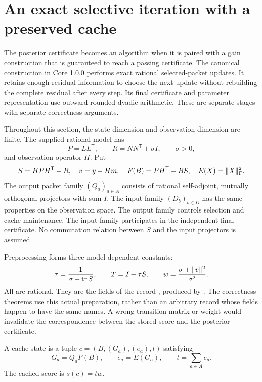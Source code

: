 \section{An exact selective iteration with a preserved cache}
\label{sec:solver-cache}

The posterior certificate becomes an algorithm when it is paired with a gain
construction that is guaranteed to reach a passing certificate. The canonical
construction in Core 1.0.0 performs exact rational selected-packet updates. It
retains enough residual information to choose the next update without rebuilding
the complete residual after every step. Its final certificate and parameter
representation use outward-rounded dyadic arithmetic. These are separate stages
with separate correctness arguments.

Throughout this section, the state dimension and observation dimension are finite.
The supplied rational model has
\[
 P=LL^{\mathsf T},\qquad R=NN^{\mathsf T}+\sigma I,
 \qquad \sigma>0,
\]
and observation operator $H$. Put
\[
 S=HPH^{\mathsf T}+R,\quad v=y-Hm,\quad
 F(B)=PH^{\mathsf T}-BS,\quad E(X)=\lVert X\rVert_{\mathrm F}^{2}.
\]
The output packet family $(Q_a)_{a\in A}$ consists of rational self-adjoint,
mutually orthogonal projectors with sum $I$. The input family $(D_b)_{b\in D}$
has the same properties on the observation space. The output family controls
selection and cache maintenance. The input family participates in the independent
final certificate. No commutation relation between $S$ and the input projectors
is assumed.

Preprocessing forms three model-dependent constants:
\begin{equation}
 \tau=\frac{1}{\sigma+\operatorname{tr} S},\qquad T=I-\tau S,
 \qquad w=\frac{\sigma+\lVert v\rVert^{2}}{\sigma^{2}}.
 \label{eq:solver-kernel}
\end{equation}
All are rational. They are the fields of the record
, produced by
. The correctness theorems use this actual
preparation, rather than an arbitrary record whose fields happen to have the same
names. A wrong transition matrix or weight would invalidate the correspondence
between the stored score and the posterior certificate.

\begin{definition}
A cache state is a tuple $c=(B,(G_a),(e_a),t)$ satisfying
\begin{equation}
 G_a=Q_aF(B),\qquad e_a=E(G_a),\qquad t=\sum_{a\in A}e_a.
 \label{eq:solver-invariant}
\end{equation}
The cached score is $s(c)=tw$.
\end{definition}

